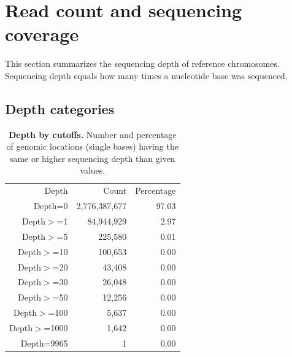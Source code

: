 \documentclass{article}
\begin{document}
\pagebreak
\section{Read count and sequencing coverage}
This section summarizes the sequencing depth of reference chromosomes. Sequencing depth equals how many times a nucleotide base was sequenced.

\subsection{Depth categories}
\begin{table}
\begin{tabular}{|r|r|r|}
  \hline
Depth & Count & Percentage \\ 
  \rowcolor[gray]{0.9} \hline
Depth=0 & 2,776,387,677 & 97.03 \\ 
  Depth$>$=1 & 84,944,929 &  2.97 \\ 
   \rowcolor[gray]{0.9}Depth$>$=5 & 225,580 &  0.01 \\ 
  Depth$>$=10 & 100,653 &  0.00 \\ 
   \rowcolor[gray]{0.9}Depth$>$=20 & 43,408 &  0.00 \\ 
  Depth$>$=30 & 26,048 &  0.00 \\ 
   \rowcolor[gray]{0.9}Depth$>$=50 & 12,256 &  0.00 \\ 
  Depth$>$=100 & 5,637 &  0.00 \\ 
   \rowcolor[gray]{0.9}Depth$>$=1000 & 1,642 &  0.00 \\ 
  Depth=9965 & 1 &  0.00 \\ 
   \hline
\end{tabular}\caption{\textbf{Depth by cutoffs.} Number and percentage of genomic locations (single bases) having the same or higher sequencing depth than given values.}
\end{table}
\end{document}
